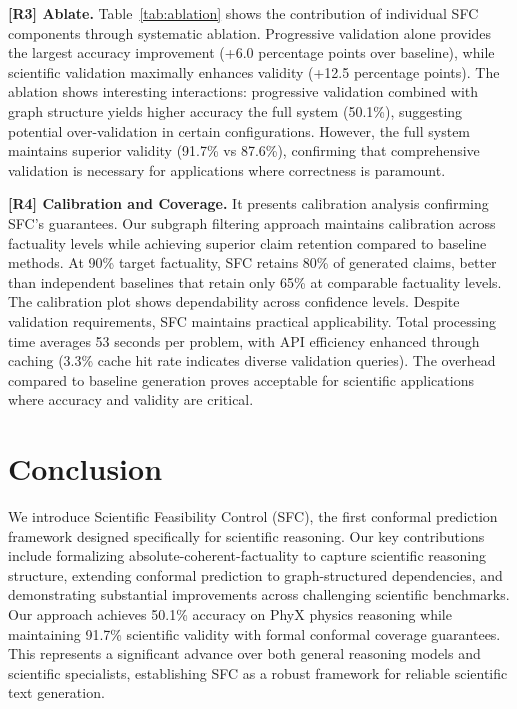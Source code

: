 \documentclass{uai2026} %
\theoremstyle{remark}
\theoremstyle{plain}
\theoremstyle{definition}
\begin{document}
\textbf{[R3] Ablate.} Table~\ref{tab:ablation} shows the contribution of individual SFC components through systematic ablation. Progressive validation alone provides the largest accuracy improvement (+6.0 percentage points over baseline), while scientific validation maximally enhances validity (+12.5 percentage points). The ablation shows interesting interactions: progressive validation combined with graph structure yields higher accuracy the full system (50.1\%), suggesting potential over-validation in certain configurations. However, the full system maintains superior validity (91.7\% vs 87.6\%), confirming that comprehensive validation is necessary for applications where correctness is paramount.


\textbf{[R4] Calibration and Coverage.} 
It presents calibration analysis confirming SFC's guarantees. Our subgraph filtering approach maintains calibration across factuality levels while achieving superior claim retention compared to baseline methods. At 90\% target factuality, SFC retains 80\% of generated claims, better than independent baselines that retain only 65\% at comparable factuality levels. The calibration plot shows dependability across confidence levels. Despite validation requirements, SFC maintains practical applicability. Total processing time averages 53 seconds per problem, with API efficiency enhanced through caching (3.3\% cache hit rate indicates diverse validation queries). The overhead compared to baseline generation proves acceptable for scientific applications where accuracy and validity are critical.

\section{Conclusion}

We introduce Scientific Feasibility Control (SFC), the first conformal prediction framework designed specifically for scientific reasoning. Our key contributions include formalizing absolute-coherent-factuality to capture scientific reasoning structure, extending conformal prediction to graph-structured dependencies, and demonstrating substantial improvements across challenging scientific benchmarks. Our approach achieves 50.1\% accuracy on PhyX physics reasoning while maintaining 91.7\% scientific validity with formal conformal coverage guarantees. This represents a significant advance over both general reasoning models and scientific specialists, establishing SFC as a robust framework for reliable scientific text generation.
\end{document}
